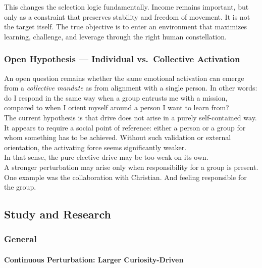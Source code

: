 

This changes the selection logic fundamentally. Income remains important, but only as a constraint that preserves stability and freedom of movement. It is not the target itself. The true objective is to enter an environment that maximizes learning, challenge, and leverage through the right human constellation.

\subsubsection{Open Hypothesis — Individual vs.\ Collective Activation}

An open question remains whether the same emotional activation can emerge from a \emph{collective mandate} as from alignment with a single person. In other words: do I respond in the same way when a group entrusts me with a mission, compared to when I orient myself around a person I want to learn from?\\

The current hypothesis is that drive does not arise in a purely self-contained way. It appears to require a social point of reference: either a person or a group for whom something has to be achieved. Without such validation or external orientation, the activating force seems significantly weaker.\\


In that sense, the pure elective drive may be too weak on its own.\\

A stronger perturbation may arise only when responsibility for a group is present. One example was the collaboration with Christian. And feeling responsible for the group.

\subsection{Study and Research}


\subsubsection{General}

\paragraph{Continuous Perturbation: Larger Curiosity-Driven}

